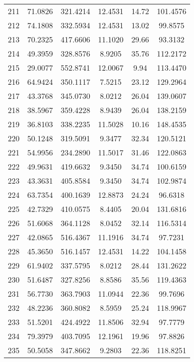 \begin{center}
\begin{footnotesize}
\begin{tabular}{|c|ccccc|}
211 & 71.0826 & 321.4214 & 12.4531 & 14.72 & 101.4576 \\
212 & 74.1808 & 332.5934 & 12.4531 & 13.02 & 99.8575 \\
213 & 70.2325 & 417.6606 & 11.1020 & 29.66 & 93.3132 \\
214 & 49.3959 & 328.8576 & 8.9205 & 35.76 & 112.2172 \\
215 & 29.0077 & 552.8741 & 12.0067 & 9.94 & 113.4470 \\
216 & 64.9424 & 350.1117 & 7.5215 & 23.12 & 129.2964 \\
217 & 43.3768 & 345.0730 & 8.0212 & 26.04 & 139.0607 \\
218 & 38.5967 & 359.4228 & 8.9439 & 26.04 & 138.2159 \\
219 & 36.8103 & 338.2235 & 11.5028 & 10.16 & 148.4535 \\
220 & 50.1248 & 319.5091 & 9.3477 & 32.34 & 120.5121 \\
221 & 54.9956 & 234.2890 & 11.5017 & 31.46 & 122.0863 \\
222 & 49.9631 & 419.6632 & 9.3450 & 34.74 & 100.6159 \\
223 & 43.3631 & 405.8584 & 9.3450 & 34.74 & 102.9874 \\
224 & 63.7354 & 400.1639 & 12.8873 & 24.24 & 96.6318 \\
225 & 42.7329 & 410.0575 & 8.4405 & 20.04 & 131.6816 \\
226 & 51.6068 & 364.1128 & 8.0452 & 32.14 & 116.5314 \\
227 & 42.0865 & 516.4367 & 11.1916 & 34.74 & 97.7231 \\
228 & 45.3650 & 516.1457 & 12.4531 & 14.22 & 104.1458 \\
229 & 61.9402 & 337.5795 & 8.0212 & 28.44 & 131.2622 \\
230 & 51.6487 & 327.8256 & 8.8586 & 35.56 & 119.4363 \\
231 & 56.7730 & 363.7903 & 11.0944 & 22.36 & 99.7696 \\
232 & 48.2236 & 360.8082 & 8.5959 & 25.24 & 118.9967 \\
233 & 51.5201 & 424.4922 & 11.8506 & 32.94 & 97.7779 \\
234 & 79.3979 & 403.7095 & 12.1961 & 19.96 & 97.8826 \\
235 & 50.5058 & 347.8662 & 9.2803 & 22.36 & 118.8251 \\
\hline
\end{tabular}
\end{footnotesize}
\end{center}

